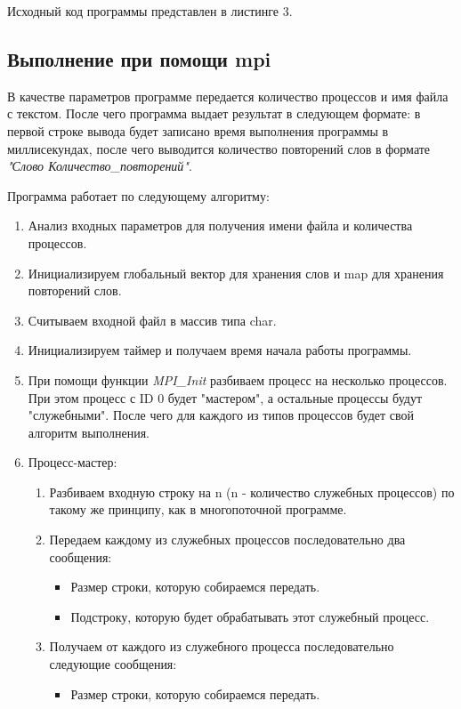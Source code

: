 \documentclass[12pt,a4paper]{report}
\begin{document}
				Исходный код программы представлен в листинге 3.
				
			\subsection{Выполнение при помощи mpi}
					В качестве параметров программе передается количество процессов и имя файла с текстом. После чего программа выдает результат в следующем формате: в первой строке вывода будет записано время выполнения программы в миллисекундах, после чего выводится количество повторений слов в формате \textit{"Слово Количество\_повторений"}.
					
					Программа работает по следующему алгоритму:
					\begin{enumerate}
						\item Анализ входных параметров для получения имени файла и количества процессов.
						\item Инициализируем глобальный вектор для хранения слов и map для хранения повторений слов.
						\item Считываем входной файл в массив типа char.
						\item Инициализируем таймер и получаем время начала работы программы.
						\item При помощи функции \textit{MPI\_Init} разбиваем процесс на несколько процессов. При этом процесс с ID 0 будет "мастером", а остальные процессы будут "служебными". После чего для каждого из типов процессов будет свой алгоритм выполнения.
						\item Процесс-мастер:
							\begin{enumerate}
								\item Разбиваем входную строку на n (n - количество служебных процессов) по такому же принципу, как в многопоточной программе.
								\item Передаем каждому из служебных процессов последовательно два сообщения:
									\begin{itemize}
										\item Размер строки, которую собираемся передать.
										\item Подстроку, которую будет обрабатывать этот служебный процесс.
									\end{itemize}
								\item Получаем от каждого из служебного процесса последовательно следующие сообщения:
									\begin{itemize}
										\item Размер строки, которую собираемся передать.

\end{itemize}
\end{enumerate}
\end{enumerate}
\end{document}
